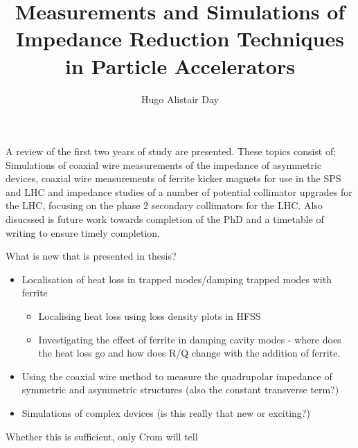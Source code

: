 \documentclass[12pt,PhD]{Thesis}
\begin{document}
%
\title{Measurements and Simulations of Impedance Reduction Techniques in Particle Accelerators}
\author{Hugo Alistair Day}


\beforeabstract
{}
A review of the first two years of study are presented. These topics consist of; Simulations of coaxial wire measurements of the impedance of asymmetric devices, coaxial wire measurements of ferrite kicker magnets for use in the SPS and LHC and impedance studies of a number of potential collimator upgrades for the LHC, focusing on the phase 2 secondary collimators for the LHC. Also disucssed is future work towards completion of the PhD and a timetable of writing to ensure timely completion.
\afterabstract
\afterpreface


\tableofcontents

%
%
%

What is new that is presented in thesis?
\begin{itemize}
\item{Localisation of heat loss in trapped modes/damping trapped modes with ferrite}
\begin{itemize}
\item{Localising heat loss using loss density plots in HFSS}
\item{Investigating the effect of ferrite in damping cavity modes - where does the heat loss go and how does R/Q change with the addition of ferrite.}
\end{itemize}
\item{Using the coaxial wire method to measure the quadrupolar impedance of symmetric and asymmetric structures (also the constant transverse term?)}
\item{Simulations of complex devices (is this really that new or exciting?)}
\end{itemize}

Whether this is sufficient, only Crom will tell
\end{document}
